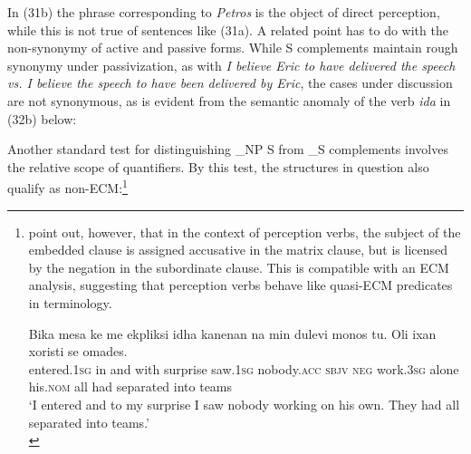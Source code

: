 \documentclass[output=paper]{langsci/langscibook}
\begin{document}
In (31b) the phrase corresponding to \textit{Petros} is the object of direct perception, while this is not true of sentences like (31a). A related point has to do with the non-synonymy of active and passive forms. While S complements maintain rough synonymy under passivization, as with \textit{I believe Eric to have delivered the speech vs. I believe the speech to have been delivered by Eric}, the cases under discussion are not synonymous, as is evident from the semantic anomaly of the verb \textit{ida} in (32b) below:

\ea%
    \label{ex:alexiadou:37}
    \z
\z
    
Another standard test for distinguishing \_NP S from \_S complements involves the relative scope of quantifiers. By this test, the structures in question also qualify as non-ECM:\footnote{\citet{Alexiadou2016} point out, however, that in the context of perception verbs, the subject of the embedded clause is assigned accusative in the matrix clause, but is licensed by the negation in the subordinate clause. This is compatible with an ECM analysis, suggesting that perception verbs behave like quasi-ECM predicates in  terminology.

\ea \gll Bika  mesa    ke me     ekpliksi idha       kanenan         na min dulevi monos tu. Oli ixan             xoristi      se omades.\\
        entered{}.\textsc{1sg} in   and with   surprise saw{}.\textsc{1sg} nobody{}.\textsc{acc}  \textsc{sbjv}  \textsc{neg} work{}.\textsc{3sg} alone his.\textsc{nom}    all had separated into teams\\
    \glt ‘I entered and to my surprise I saw nobody working on his own. They had all separated into teams.’\\
\z
        }
\end{document}
